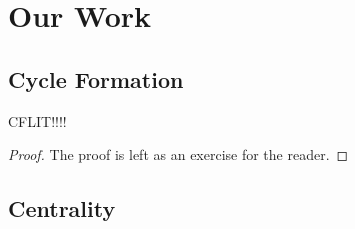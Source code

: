 \section{Our Work}

\subsection{Cycle Formation}

\begin{theorem}
CFLIT!!!!
\end{theorem}
\begin{proof}
The proof is left as an exercise for the reader.
\end{proof}

\subsection{Centrality}